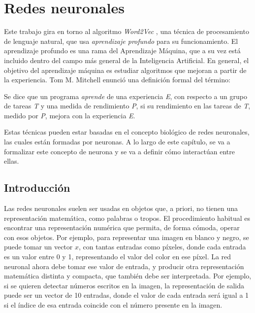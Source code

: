 \chapter{Redes neuronales}

Este trabajo gira en torno al algoritmo \textit{Word2Vec} \cite{word2vec:1} \cite{word2vec:2}, una técnica de procesamiento
de lenguaje natural, que usa \textit{aprendizaje profundo} para su funcionamiento. El aprendizaje
profundo es una rama del Aprendizaje Máquina, que a su vez está incluido dentro del campo más general
de la Inteligencia Artificial. En general, el objetivo del aprendizaje máquina es estudiar algoritmos
que mejoran a partir de la experiencia. Tom M. Mitchell \cite{mitchell1997} enunció una definición formal
del término:

\begin{definition}[Aprender]
    Se dice que un programa \textit{aprende} de una experiencia \textit{E}, con respecto a un grupo
    de tareas \textit{T} y una medida de rendimiento \textit{P}, si su rendimiento en las tareas de
    \textit{T}, medido por \textit{P}, mejora con la experiencia \textit{E}.
\end{definition}

Estas técnicas pueden estar basadas en el concepto biológico de redes neuronales, las cuales están formadas por neuronas.
A lo largo de este capítulo, se va a formalizar este concepto de neurona y se va a definir cómo interactúan entre ellas.

\section{Introducción}

Las redes neuronales suelen ser usadas en objetos que, a priori, no tienen una representación matemática,
como palabras o tropos. El procedimiento habitual es encontrar una representación numérica que permita, de forma
cómoda, operar con esos objetos. Por ejemplo, para representar una imagen en blanco y negro, se puede
tomar un vector $x$, con tantas entradas como píxeles, donde cada entrada es un valor entre 0 y 1,
representando el valor del color en ese píxel. La red neuronal ahora debe tomar ese valor de entrada,
y producir otra representación matemática distinta y compacta, que también debe ser interpretada. Por ejemplo,
si se quieren detectar números escritos en la imagen, la representación de salida puede ser un vector
de 10 entradas, donde el valor de cada entrada será igual a 1 si el índice de esa entrada coincide con
el número presente en la imagen.


